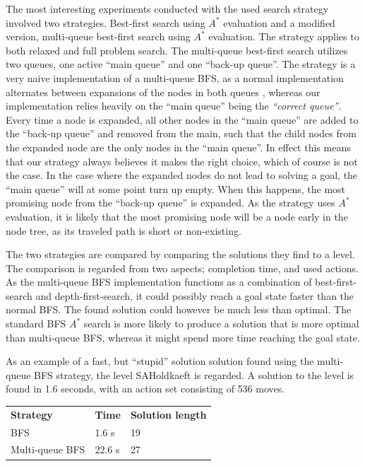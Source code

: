 \documentclass[Main]{subfiles}
\begin{document}
The most interesting experiments conducted with the used search strategy involved two strategies. Best-first search using $A^*$ evaluation and a modified version, multi-queue best-first search using $A^*$ evaluation. The strategy applies to both relaxed and full problem search. 
The multi-queue best-first search utilizes two queues, one active ``main queue'' and one ``back-up queue''. The strategy is a very naive implementation of a multi-queue BFS, as a normal implementation alternates between expansions of the nodes in both queues \citep{hector2013a}, whereas our implementation relies heavily on the ``main queue'' being the \textit{``correct queue''}. Every time a node is expanded, all other nodes in the ``main queue'' are added to the ``back-up queue'' and removed from the main, such that the child nodes from the expanded node are the only nodes in the ``main queue''. In effect this means that our strategy always believes it makes the right choice, which of course is not the case. In the case where the expanded nodes do not lead to solving a goal, the ``main queue'' will at some point turn up empty. When this happens, the most promising node from the ``back-up queue'' is expanded. As the strategy uses $A^*$ evaluation, it is likely that the most promising node will be a node early in the node tree, as its traveled path is short or non-existing. 

The two strategies are compared by comparing the solutions they find to a level. The comparison is regarded from two aspects; completion time, and used actions. As the multi-queue BFS implementation functions as a combination of best-first-search and depth-first-search, it could possibly reach a goal state faster than the normal BFS. The found solution could however be much less than optimal. The standard BFS $A^*$ search is more likely to produce a solution that is more optimal than multi-queue BFS, whereas it might spend more time reaching the goal state. 

As an example of a fast, but ``stupid'' solution solution found using the multi-queue BFS strategy, the level SAHoldkaeft is regarded. A solution to the level is found in 1.6 seconds, with an action set consisting of 536 moves. 

\begin{table}[h]
\begin{tabular}{lll}
\rowcolor{grayish}
\textbf{Strategy} & \textbf{Time} & \textbf{Solution length} \\   %
BFS             & 1.6 s        & 19                       \\    %
Multi-queue BFS & 22.6 s       & 27                       %
\end{tabular}
\end{table}
\end{document}
